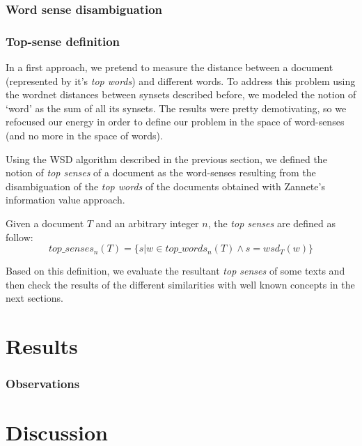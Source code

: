 \documentclass{pnastwo}
\newcommand\sq[1]{\textquoteleft #1\textquoteright}
\begin{document}
\begin{article}
\subsubsection{Word sense disambiguation}

\subsubsection{Top-sense definition}

In a first approach, we pretend to measure the distance between a document (represented by it's \textit{top words}) and different words. To address this problem using the wordnet distances between synsets described before, we modeled the notion of \sq{word} as the sum of all its synsets. The results were pretty demotivating, so we refocused our energy in order to define our problem in the space of word-senses (and no more in the space of words). 

Using the WSD algorithm described in the previous section, we defined the notion of \textit{top senses} of a document as the word-senses resulting from the disambiguation of the \textit{top words} of the documents obtained with Zannete's information value approach.

Given a document $T$ and an arbitrary integer $n$, the \textit{top senses} are defined as follow:
\begin{equation}
  top\_senses_{n}(T) = \{s | w \in top\_words_{n}(T) \wedge  s = wsd_T(w)\}
\end{equation}

Based on this definition, we evaluate the resultant \textit{top senses} of some texts and then check the results of the different similarities with well known concepts in the next sections.

\section{Results}




\subsubsection{Observations}

\section{Discussion}



\end{article}
\end{document}
